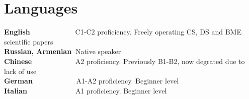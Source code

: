 \section{Languages}
\resumeSubHeadingListStart      
\resumeProjectHeading
    {\textbf{English} $\> \> \> \> \> \> \> \> \> \> \> \> \> \> \> \> \> \> \> \> \> \> \> \> \> \> $ {C1-C2 proficiency. Freely operating CS, DS and BME scientific papers}}{}\\
\resumeProjectHeading
    {\textbf{Russian, Armenian}$\> $ {Native speaker}}{}\\
\resumeProjectHeading
    {\textbf{Chinese} $\> \> \> \> \> \> \> \> \> \> \> \> \> \> \> \> \> \> \> \> \> \> \> \> \>$ {A2 proficiency. Previously B1-B2, now degrated due to lack of use}}{}\\
\resumeProjectHeading
    {\textbf{German}  $\> \> \> \> \> \> \> \> \> \> \> \> \> \> \> \> \> \> \> \> \> \> \> \> \> $ {A1-A2 proficiency. Beginner level}}{}\\
\res\resumeProjectHeading
    {\textbf{Italian}  $\> \> \> \> \> \> \> \> \> \> \> \> \> \> \> \> \> \> \> \> \> \> \> \> \> \> \> \>$ {A1 proficiency. Beginner level}}{}\\
\resumeSubHeadingListEnd
